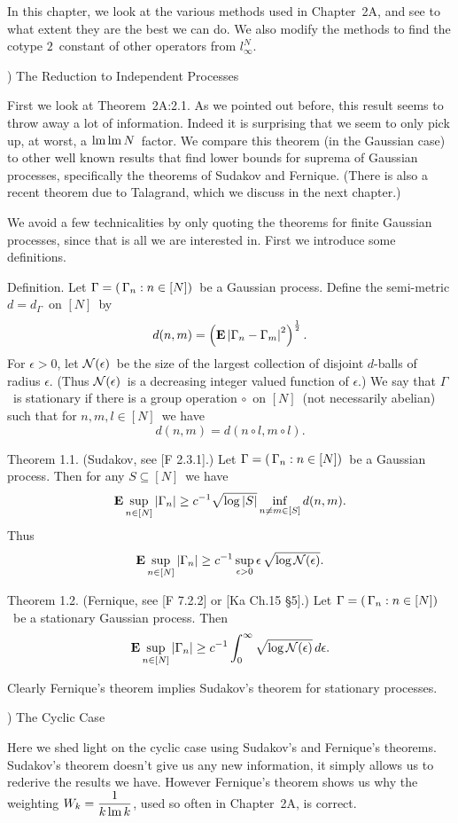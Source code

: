 In this chapter, we look at the various methods used in Chapter~2A,
and see to
what extent they are the best we can do. We also modify the methods
to
find the cotype $2$\ constant of other operators from $l_\infty^N$.
 
) The Reduction to Independent Processes
 
First we look at Theorem~2A:2.1. As we pointed out before, this result
seems
to throw away a lot of information. Indeed it is surprising that
we seem to
only pick up, at worst, a $\mathop{\rm lm}\nolimits\mathop{\rm lm}\nolimits N$\ factor. We compare this
theorem (in the Gaussian case) to other well known results that find
lower
bounds for suprema of Gaussian processes, specifically the theorems
of Sudakov
and Fernique. (There is also a recent theorem due to Talagrand, which
we
discuss in the next chapter.)
 
We avoid a few technicalities by only quoting the theorems for finite
Gaussian
processes, since that is all we are interested in.
First we introduce some definitions.
 
\proclaim Definition. Let $\Gamma=(\,\Gamma_n:n\in[N])$\ be a Gaussian process.
Define
the semi-metric $d = d_\Gamma$\ on $[N]$\ by
$$ d(n,m) = \left( {\bf E} \left| \Gamma_n-\Gamma_m \right|^2 \right)^{1\over2}
.$$
\moreproclaim
For $\epsilon>0$, let ${\cal N}(\epsilon)$\ be the size of the largest
collection of
disjoint $d$-balls of radius $\epsilon$. (Thus ${\cal N}(\epsilon)$\ is
a decreasing
integer valued function of $\epsilon$.)
\moreproclaim
We say that $\Gamma$\ is {\dt stationary} if there is a group operation
$\circ$\ on
$[N]$\ (not necessarily abelian) such that for $n,m,l\in[N]$\ we
have
$$ d(n,m) = d(n\circ l,m\circ l) .$$
 
\proclaim Theorem 1.1. (Sudakov, see [F 2.3.1].) Let $\Gamma=(\,\Gamma_n:n\in[N])$\
be a
Gaussian process. Then for any $S\subseteq[N]$\ we have
$$ {\bf E}\sup_{n\in[N]} | \Gamma_n | \ge c^{-1} \sqrt{\log\left| S\right|} \inf_{n\ne m\in[S]} d(n,m)
.$$
Thus
$$ {\bf E}\sup_{n\in[N]} | \Gamma_n | \ge c^{-1} \sup_{\epsilon>0} \epsilon \,\sqrt{\log {\cal N}(\epsilon)}
.$$
 
\proclaim Theorem 1.2. (Fernique, see [F 7.2.2] or [Ka Ch.15 \S5].)
Let $\Gamma=(\,\Gamma_n:n\in[N])$\ be a
stationary Gaussian process. Then
$$ {\bf E}\sup_{n\in[N]} | \Gamma_n | \ge c^{-1} \int_0^\infty \sqrt{\log {\cal N}(\epsilon)} \,d\epsilon .$$
 
Clearly Fernique's theorem implies Sudakov's theorem for stationary
processes.
 
) The Cyclic Case
 
Here we shed light on the cyclic case using Sudakov's and Fernique's
theorems.
Sudakov's theorem doesn't give us any new information, it simply
allows us to
rederive the results we have. However Fernique's theorem shows us
why the
weighting $W_k={\displaystyle{{1\over k\mathop{\rm lm}\nolimits k}}}$, used so often in Chapter~2A, is correct.
 
